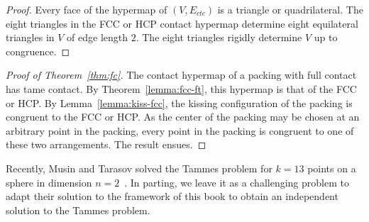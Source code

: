 \begin{proof} Every face of the hypermap of $(V,E_{ctc})$ is a
  triangle or quadrilateral.  The eight triangles in the FCC or HCP
  contact hypermap determine eight equilateral triangles in $V$ of
  edge length $2$.  The eight triangles rigidly determine $V$ up to
  congruence.
\end{proof}

\begin{proof}[Proof of Theorem~\ref{thm:fc}]  %
  The contact hypermap of a packing with full contact has tame
  contact.  By Theorem~\ref{lemma:fcc-ft}, this hypermap is that of
  the FCC or HCP.  By Lemma~\ref{lemma:kiss-fcc}, the kissing
  configuration of the packing is congruent to the FCC or HCP.  As the
  center of the packing may be chosen at an arbitrary point in the
  packing, every point in the packing is congruent to one of these two
  arrangements.  The result ensues.
\end{proof}


\begin{exer}
  Recently, Musin and Tarasov solved the Tammes problem for $k=13$
  points on a sphere in dimension $n=2$~\cite{Musin-Tarasov}.  In
  parting, we leave it as a challenging problem to adapt their
  solution to the framework of this book to obtain an independent
  solution to the Tammes problem.
\end{exer}
